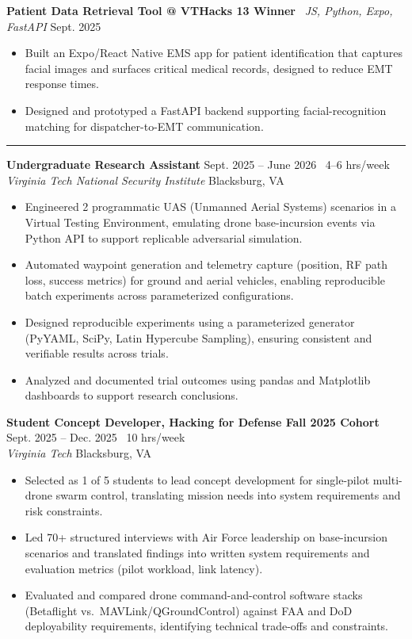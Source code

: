 \documentclass[letterpaper,10pt]{article}
\newcommand{\resumesection}[1]{%
    \vspace{6pt}
    \noindent{\large\bfseries #1}\par
    \vspace{2pt}
    \hrule
    \vspace{4pt}
}
\begin{document}
\textbf{Patient Data Retrieval Tool @ VTHacks 13 Winner} \textbar\ \textit{JS, Python, Expo, FastAPI} \hfill Sept. 2025
\begin{itemize}
    \item Built an Expo/React Native EMS app for patient identification that captures facial images and surfaces critical medical records, designed to reduce EMT response times.
    \item Designed and prototyped a FastAPI backend supporting facial-recognition matching for dispatcher-to-EMT communication.
\end{itemize}

\resumesection{Experience}

\textbf{Undergraduate Research Assistant} \hfill Sept. 2025 -- June 2026 \textbar\ 4--6 hrs/week\\
\textit{Virginia Tech National Security Institute} \hfill Blacksburg, VA
\begin{itemize}
    \item Engineered 2 programmatic UAS (Unmanned Aerial Systems) scenarios in a Virtual Testing Environment, emulating drone base-incursion events via Python API to support replicable adversarial simulation.
    \item Automated waypoint generation and telemetry capture (position, RF path loss, success metrics) for ground and aerial vehicles, enabling reproducible batch experiments across parameterized configurations.
    \item Designed reproducible experiments using a parameterized generator (PyYAML, SciPy, Latin Hypercube Sampling), ensuring consistent and verifiable results across trials.
    \item Analyzed and documented trial outcomes using pandas and Matplotlib dashboards to support research conclusions.
\end{itemize}

\vspace{4pt}

\textbf{Student Concept Developer, Hacking for Defense Fall 2025 Cohort} \hfill Sept. 2025 -- Dec. 2025 \textbar\ 10 hrs/week\\
\textit{Virginia Tech} \hfill Blacksburg, VA
\begin{itemize}
    \item Selected as 1 of 5 students to lead concept development for single-pilot multi-drone swarm control, translating mission needs into system requirements and risk constraints.
    \item Led 70+ structured interviews with Air Force leadership on base-incursion scenarios and translated findings into written system requirements and evaluation metrics (pilot workload, link latency).
    \item Evaluated and compared drone command-and-control software stacks (Betaflight vs.\ MAVLink/QGroundControl) against FAA and DoD deployability requirements, identifying technical trade-offs and constraints.
\end{itemize}
\end{document}
